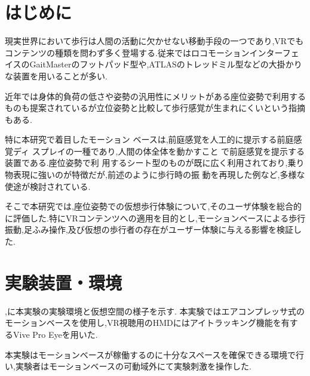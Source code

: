 \documentclass[uplatex]{jsarticle}   %
\begin{document}
\vspace{3mm}

\setcounter{page}{1}

\section{はじめに}

現実世界において歩行は人間の活動に欠かせない移動手段の一つであり,VRでもコンテンツの種類を問わず多く登場する.従来ではロコモーションインターフェイスのGaitMaster\cite{文献2}のフットパッド型や,ATLAS\cite{文献3}のトレッドミル型などの大掛かりな装置を用いることが多い.

近年では身体的負荷の低さや姿勢の汎用性にメリットがある座位姿勢で利用するものも提案されているが立位姿勢と比較して歩行感覚が生まれにくいという指摘もある.


特に本研究で着目したモーション
ベースは,前庭感覚を人工的に提示する前庭感覚ディ
スプレイの一種であり,人間の体全体を動かすこと
で前庭感覚を提示する装置である.座位姿勢で利
用するシート型のものが既に広く利用されており,乗り
物表現に強いのが特徴だが,前述のように歩行時の振
動を再現した例など,多様な使途が検討されている.


そこで本研究では,座位姿勢での仮想歩行体験について,そのユーザ体験を総合的に評価した.特にVRコンテンツへの適用を目的とし,モーションベースによる歩行振動,足ふみ操作,及び仮想の歩行者の存在がユーザー体験に与える影響を検証した.


\section{実験装置・環境}
,に本実験の実験環境と仮想空間の様子を示す.
本実験ではエアコンプレッサ式のモーションベースを使用し,VR視聴用のHMDにはアイトラッキング機能を有するVive Pro Eyeを用いた.

本実験はモーションベースが稼働するのに十分なスペースを確保できる環境で行い,実験者はモーションベースの可動域外にて実験刺激を操作した.
\end{document}
